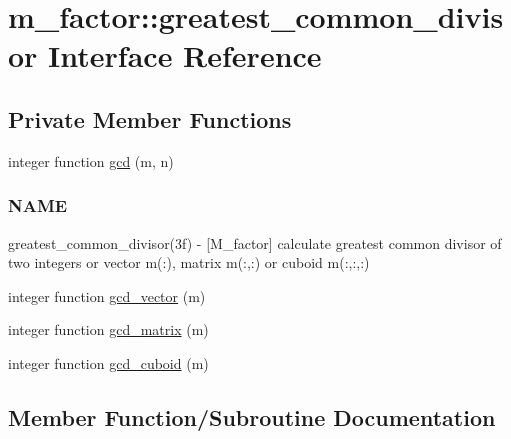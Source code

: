 \hypertarget{interfacem__factor_1_1greatest__common__divisor}{}\section{m\+\_\+factor\+:\+:greatest\+\_\+common\+\_\+divisor Interface Reference}
\label{interfacem__factor_1_1greatest__common__divisor}
\subsection*{Private Member Functions}
\begin{DoxyCompactItemize}
\item 
integer function \hyperlink{interfacem__factor_1_1greatest__common__divisor_ab9a93ff79f9c16b485d0632eeed385b6}{gcd} (m, n)
\begin{DoxyCompactList}\small\item\em \subsubsection*{N\+A\+ME}

greatest\+\_\+common\+\_\+divisor(3f) -\/ \mbox{[}M\+\_\+factor\mbox{]} calculate greatest common divisor of two integers or vector m(\+:), matrix m(\+:,\+:) or cuboid m(\+:,\+:,\+:) \end{DoxyCompactList}\item 
integer function \hyperlink{interfacem__factor_1_1greatest__common__divisor_a19a227039630336f719838eb941fa28f}{gcd\+\_\+vector} (m)
\item 
integer function \hyperlink{interfacem__factor_1_1greatest__common__divisor_a4222039246a4ae0dd1b1dbc8acd15e43}{gcd\+\_\+matrix} (m)
\item 
integer function \hyperlink{interfacem__factor_1_1greatest__common__divisor_a97be1fa43fb41e5e96ee3bbe2f9e6dd5}{gcd\+\_\+cuboid} (m)
\end{DoxyCompactItemize}


\subsection{Member Function/\+Subroutine Documentation}
\mbox{\label{interfacem__factor_1_1greatest__common__divisor_ab9a93ff79f9c16b485d0632eeed385b6}} 
